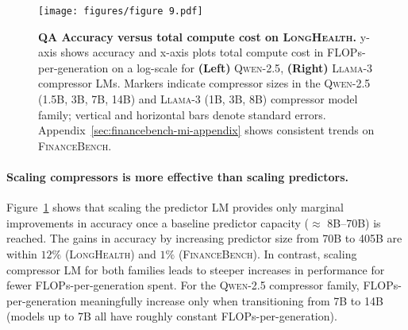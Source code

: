 \documentclass{article} %
\begin{document}


\begin{figure}[htb]
    \centering
    \texttt{[image: figures/figure 9.pdf]}
    \caption{\textbf{QA Accuracy versus total compute cost on \textsc{LongHealth}.} y-axis shows accuracy and x-axis plots total compute cost in FLOPs-per-generation on a log-scale for \textbf{(Left)} \textsc{Qwen-2.5}, \textbf{(Right)} \textsc{Llama-3} compressor LMs. Markers indicate compressor sizes in the \textsc{Qwen-2.5} (1.5B, 3B, 7B, 14B) and \textsc{Llama-3} (1B, 3B, 8B) compressor model family; vertical and horizontal bars denote standard errors. Appendix~\ref{sec:financebench-mi-appendix} shows consistent trends on \textsc{FinanceBench}.}
    \label{fig:figure-9-totalcost}
\end{figure}

\paragraph*{Scaling compressors is more effective than scaling predictors.} Figure~\ref{fig:figure-9-totalcost} shows that scaling the predictor LM provides only marginal improvements in accuracy once a baseline predictor capacity ($\approx$ 8B--70B) is reached. The gains in accuracy by increasing predictor size from 70B to 405B are within $12\%$ (\textsc{LongHealth}) and $1\%$ (\textsc{FinanceBench}). In contrast, scaling compressor LM for both families leads to steeper increases in performance for fewer FLOPs-per-generation spent. For the \textsc{Qwen-2.5} compressor family, FLOPs-per-generation meaningfully increase only when transitioning from 7B to 14B (models up to 7B all have roughly constant FLOPs-per-generation). 
\end{document}
